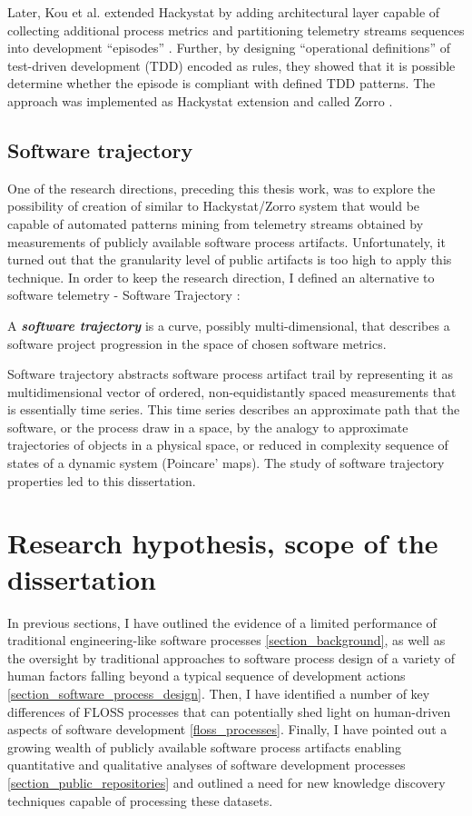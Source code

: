 Later, Kou et al. extended Hackystat by adding architectural layer capable of collecting additional process metrics 
and partitioning telemetry streams sequences into development ``episodes'' \cite{citeulike:6180831}. 
Further, by designing ``operational definitions'' of test-driven development (TDD) encoded as rules,
they showed that it is possible determine whether the episode is compliant with
defined TDD patterns.
The approach was implemented as Hackystat extension and called Zorro \cite{citeulike:11538873}.

\subsection{Software trajectory}
One of the research directions, preceding this thesis work, was to explore the possibility of creation of similar 
to Hackystat/Zorro system that would be capable of automated patterns mining from telemetry streams obtained by 
measurements of publicly available software process artifacts. 
Unfortunately, it turned out that the granularity level of public artifacts is too high to apply this technique. 
In order to keep the research direction, I defined an alternative to software telemetry - Software Trajectory \cite{csdl2-10-09}:
\begin{defn}\label{def_trajectory}
A \textbf{\textit{software trajectory}} is a curve, possibly multi-dimensional, that describes a software project 
progression in the space of chosen software metrics.
\end{defn}
Software trajectory abstracts software process artifact trail by representing it as multidimensional vector of ordered, 
non-equidistantly spaced measurements that is essentially time series. This time series describes an approximate path that 
the software, or the process draw in a space, by the analogy to approximate trajectories of objects in a physical space, 
or reduced in complexity sequence of states of a dynamic system (Poincare' maps).
The study of software trajectory properties led to this dissertation.

%
%
\section{Research hypothesis, scope of the dissertation}\label{sec_research_hypothesis}
In previous sections, I have outlined the evidence of a limited performance of traditional engineering-like 
software processes \ref{section_background}, as well as the oversight by traditional approaches to software process 
design of a variety of human factors falling beyond a typical sequence of development actions 
\ref{section_software_process_design}.
Then, I have identified a number of key differences of FLOSS processes that can potentially shed light on 
human-driven aspects of software development \ref{floss_processes}.
Finally, I have pointed out a growing wealth of publicly available software process artifacts enabling quantitative 
and qualitative analyses of software development processes \ref{section_public_repositories} and outlined a need for 
new knowledge discovery techniques capable of processing these datasets.

